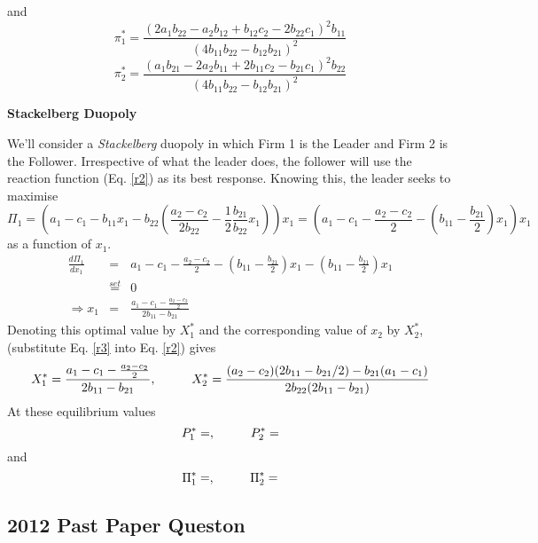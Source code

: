 \documentclass[a4paper,12pt]{article}
\begin{document}
and
 \begin{equation} \pi_1^* =\frac{ (2a_1b_{22}-a_2b_{12}+b_{12}c_2-2b_{22}c_1)^2b_{11}}{(4b_{11}b_{22}-b_{12}b_{21})^2} \label{cp1} \end{equation}
  \begin{equation} \pi_2^* = \frac{(a_1b_{21}-2a_2b_{11}+2b_{11}c_2-b_{21}c_1)^2b_{22}}{(4b_{11}b_{22}-b_{12}b_{21})^2} \label{cp2} \end{equation}


 \begin{center}
\textbf{Stackelberg Duopoly %
}
\end{center}
We'll consider a \textit{Stackelberg} duopoly in which Firm 1 is the Leader and Firm 2 is the Follower. Irrespective of what the leader does, the follower will use the reaction function (Eq. \ref{r2}) as its best response.
\newpage
Knowing this, the leader seeks to maximise $$ \Pi_1 = \left(a_1-c_1 - b_{11}x_1 -b_{22}\left( \frac{a_2-c_2}{2b_{22}} - \frac{1}{2}\frac{b_{21}}{b_{22}} x_1\right)\right) x_1 = \left( a_1 - c_1 - \frac{a_2 - c_2}{2} - \left(b_{11} - \frac{b_{21}}{2}\right)x_1\right)x_1$$
as a function of $x_1$.
\begin{eqnarray}
 \frac{d \Pi_1} {d x_1} &=&a_1 - c_1 - \frac{ a_2 - c_2}{2} - \left(b_{11} - \frac{b_{21}}{2}\right)x_1 - \left(b_{11} - \frac{b_{21}}{2}\right)x_1 \nonumber \\
 & \stackrel{set}{=} & 0 \nonumber \\
 \Rightarrow x_1 &=& \frac{a_1 - c_1 - \frac{ a_2 - c_2}{2}}{2b_{11}-b_{21}} \label{r3}
 \end{eqnarray}
 Denoting this optimal value by $X_1^*$ and the corresponding value of $x_2$ by $X_2^*$,(substitute Eq. \ref{r3} into Eq. \ref{r2}) gives
$$ X_1^* = \frac{a_1 - c_1 - \frac{ a_2 - c_2}{2}}{2b_{11}-b_{21}}, \hspace{10mm} X_2^* = \frac{(a_2-c_2)(2b_{11}-b_{21}/2)-b_{21}(a_1-c_1)}{2b_{22}(2b_{11}-b_{21})} $$
At these equilibrium values
$$ P_1^* = , \hspace{10mm} P_2^*= $$
 and
 \begin{equation} \Pi_1^* = , \hspace{10mm} \Pi_2^* = \label{sp} \end{equation}

\newpage

\subsection{2012 Past Paper Queston}
\end{document}
